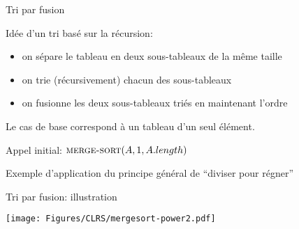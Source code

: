 \begin{frame}{Tri par fusion}

Idée d'un tri basé sur la récursion:
\begin{itemize}
\item on sépare le tableau en deux sous-tableaux de la même taille
\item on trie (récursivement) chacun des sous-tableaux
\item on fusionne les deux sous-tableaux triés en maintenant l'ordre
\end{itemize}
Le cas de base correspond à un tableau d'un seul élément.

\bigskip

\begin{center}
\end{center}

\centerline{Appel initial: $\textnormal{\scshape merge-sort}(A,1,A.length)$}

\bigskip

Exemple d'application du principe général de ``\alert{diviser pour régner}''


\end{frame}

\begin{frame}{Tri par fusion: illustration}

\centerline{\texttt{[image: Figures/CLRS/mergesort-power2.pdf]}}


\end{frame}

